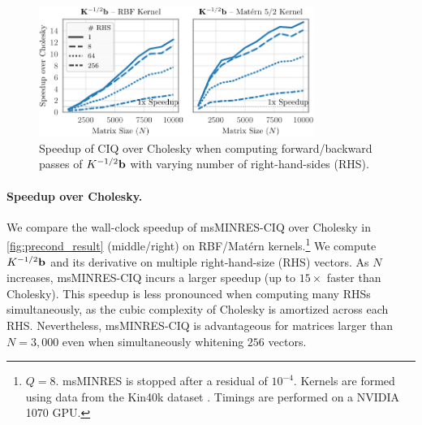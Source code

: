 \begin{figure}[t!]
	\centering
	\includegraphics[width=0.8\textwidth]{figures/timing.pdf}
  \caption[
    Speedup of CIQ over Cholesky.
  ]{
    Speedup of CIQ over Cholesky when computing forward/backward passes of $K^{-1/2} \mathbf{b}$ with varying number of right-hand-sides (RHS).
  }
  \label{fig:timing}
\end{figure}

\paragraph{Speedup over Cholesky.}
We compare the wall-clock speedup of msMINRES-CIQ over Cholesky in \cref{fig:precond_result} (middle/right) on RBF/Mat\'ern kernels.\footnote{
  $Q=8$.
  msMINRES is stopped after a residual of $10^{-4}$.
  Kernels are formed using data from the Kin40k dataset \citep{asuncion2007uci}.
  Timings are performed on a NVIDIA 1070 GPU.
}
We compute $K^{-1/2} \mathbf{b}$ and its derivative on multiple right-hand-size (RHS) vectors.
As $N$ increases, msMINRES-CIQ incurs a larger speedup (up to $15\times$ faster than Cholesky).
This speedup is less pronounced when computing many RHSs simultaneously, as the cubic complexity of Cholesky is amortized across each RHS.
Nevertheless, msMINRES-CIQ is advantageous for matrices larger than $N=3,\!000$ even when simultaneously whitening $256$ vectors.
